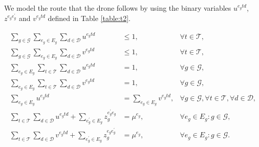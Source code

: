 \noindent
We model the route that the drone follows by using the binary variables $u^{e_gtd}$, $z^{e_ge^\prime_g}$ and $v^{e_gtd}$ defined in Table \ref{table:t2}.



\begin{align}
    \sum_{g\in \mathcal G}\sum_{e_g\in E_g} \sum_{d\in\mathcal D} u^{e_gtd} & \leq 1, &\forall t\in \mathcal T, \label{st:DEnt}\\%
    \sum_{g\in\mathcal G}\sum_{e_g\in E_g} \sum_{d\in\mathcal D} v^{e_gtd} & \leq 1, &\forall t\in \mathcal T, \label{st:DExt}\\%
    \sum_{e_g\in E_g} \sum_{t\in \mathcal T} \sum_{d\in\mathcal D} u^{e_gtd} & = 1, &\forall g\in\mathcal G, \label{st:DEng}\\%
    \sum_{e_g\in E_g} \sum_{t\in \mathcal T} \sum_{d\in\mathcal D} v^{e_gtd} & = 1, &\forall g\in\mathcal G, \label{st:DExg}\\%
    \sum_{e_g\in E_g} u^{e_gtd} & = \sum_{e_g\in E_g} v^{e_gtd}, &\forall g\in\mathcal G, \forall t\in \mathcal T, \forall d\in\mathcal D, \label{st:Duv}\\%
     \sum_{t\in \mathcal T} \sum_{d \in \mathcal D} u^{e_gtd} + \sum_{e^\prime_g\in E_g} z_g^{e^\prime_ge_g} & = \mu^{e_g}, &\forall e_g\in E_g:g\in\mathcal G, \label{st:DInu}\\
     \sum_{t\in \mathcal T} \sum_{d \in \mathcal D} v^{e_gtd} + \sum_{e^\prime_g\in E_g} z_g^{e_ge^\prime_g} & = \mu^{e_g}, &\forall e_g\in E_g:g\in\mathcal G. \label{st:DInv}
\end{align}

